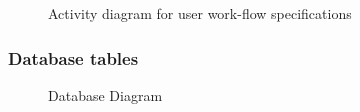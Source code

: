 \begin{figure}[H]
\centering	
{}
\caption{Activity diagram for user work-flow specifications}
\end{figure}

\subsubsection{Database tables}

\begin{figure}[H]
\centering	
{}
\caption{Database Diagram}
\end{figure}

